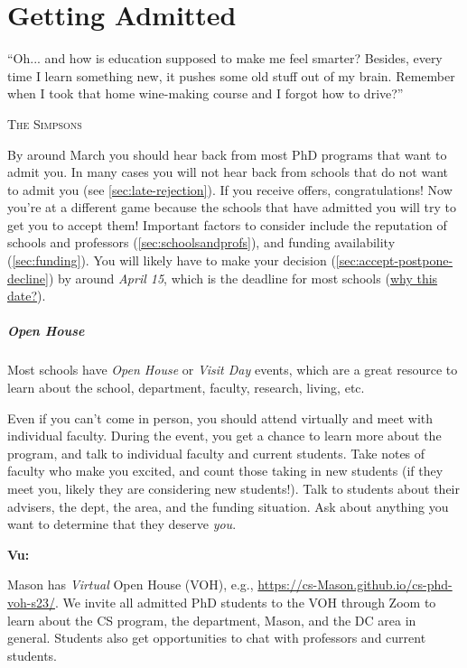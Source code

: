 \documentclass[oneside,11pt,dvipsnames]{book}
\newenvironment{commentbox}[1][]{
  \small
  \begin{mybox}
    {\small \textbf{#1}}
  }{
  \end{mybox}
}
\begin{document}
\chapter{Getting Admitted}\label{sec:accepted}

\epigraph{``Oh... and how is education supposed to make me feel smarter? Besides, every time I learn something new, it pushes some old stuff out of my brain. Remember when I took that home wine-making course and I forgot how to drive?''}{\textsc{The Simpsons}}

By around March you should hear back from most PhD programs that want to admit you.  In many cases you will not hear back from schools that do not want to admit you (see \autoref{sec:late-rejection}).
If you receive offers, congratulations!  Now you're at a different game because the schools that have admitted you will try to get you to accept them!  Important factors to consider include the reputation of schools and professors (\autoref{sec:schoolsandprofs}), and funding availability (\autoref{sec:funding}). You will likely have to make your decision (\autoref{sec:accept-postpone-decline}) by around \emph{April 15}, which is the deadline for most schools
(\href{https://cgsnet.org/wp-content/uploads/2024/01/CGS_April15_Resolution_Jan312024.pdf}{why this date?}).

\paragraph{Open House} Most schools have \emph{Open House} or \emph{Visit Day} events, which are a great resource to learn about the school, department, faculty, research, living, etc.

Even if you can't come in person, you should attend virtually and meet with individual faculty. During the event, you get a chance to learn more about the program, and talk to individual faculty and current students.  Take notes of faculty who make you excited, and count those taking in new students (if they meet you, likely they are considering new students!).  Talk to students about their advisers, the dept, the area, and the funding situation.  Ask about anything you want to determine that they deserve \emph{you}.

\begin{commentbox}[Vu:]
  Mason has \emph{Virtual} Open House (VOH), e.g., \url{https://cs-Mason.github.io/cs-phd-voh-s23/}. We invite all admitted PhD students to the VOH through Zoom to learn about the CS program, the department, Mason, and the DC area in general. Students also get opportunities to chat with professors and current students.
\end{commentbox}
\end{document}
